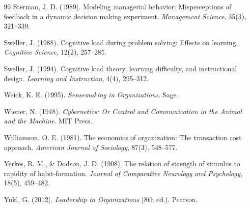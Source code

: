 \documentclass[12pt]{article}
\begin{document}
\begin{thebibliography}{99}
Sterman, J. D. (1989).
Modeling managerial behavior: Misperceptions of feedback in a dynamic
decision making experiment.
\textit{Management Science}, 35(3), 321--339.

Sweller, J. (1988).
Cognitive load during problem solving: Effects on learning.
\textit{Cognitive Science}, 12(2), 257--285.

Sweller, J. (1994).
Cognitive load theory, learning difficulty, and instructional design.
\textit{Learning and Instruction}, 4(4), 295--312.

Weick, K. E. (1995).
\textit{Sensemaking in Organizations}.
Sage.

Wiener, N. (1948).
\textit{Cybernetics: Or Control and Communication in the Animal and the Machine}.
MIT Press.

Williamson, O. E. (1981).
The economics of organization: The transaction cost approach.
\textit{American Journal of Sociology}, 87(3), 548--577.

Yerkes, R. M., \& Dodson, J. D. (1908).
The relation of strength of stimulus to rapidity of habit-formation.
\textit{Journal of Comparative Neurology and Psychology}, 18(5), 459--482.

Yukl, G. (2012).
\textit{Leadership in Organizations} (8th ed.).
Pearson.

\end{thebibliography}
\end{document}
